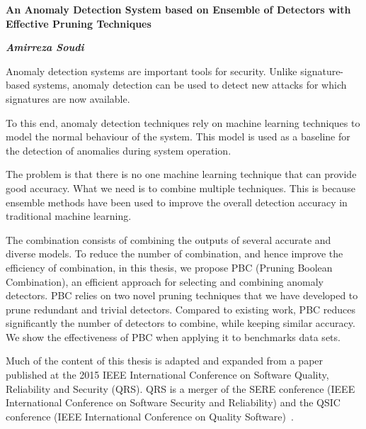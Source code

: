 \begin{center}
\textbf{An Anomaly Detection System based on Ensemble of Detectors with Effective Pruning Techniques}
\end{center}
\begin{center}
\textbf{\emph{Amirreza Soudi}}
\end{center}
Anomaly detection systems are important tools for security. Unlike signature-based systems, anomaly detection can be used to detect new attacks for which signatures are now available.

To this end, anomaly detection techniques rely on machine learning techniques to model the normal behaviour of the system. This model is used as a baseline for the detection of anomalies during system operation.

The problem is that there is no one machine learning technique that can provide good accuracy. What we need is to combine multiple techniques. This is because ensemble methods have been used to improve the overall detection accuracy in traditional machine learning. 

The combination consists of combining the outputs of several accurate and diverse models. To reduce the number of combination, and hence improve the efficiency of combination, in this thesis, we propose PBC (Pruning Boolean Combination), an efficient approach for selecting and combining anomaly detectors. PBC relies on two novel pruning techniques that we have developed to  prune redundant and trivial detectors. Compared to existing work, PBC reduces significantly the number of detectors to combine, while keeping similar accuracy. We show the effectiveness of PBC when applying it to benchmarks data sets.

Much of the content of this thesis is adapted and expanded from a paper published at the 2015 IEEE International Conference on Software Quality, Reliability and Security (QRS). QRS is a merger of the SERE conference (IEEE International Conference on Software Security and Reliability) and the QSIC conference (IEEE International Conference on Quality Software)~\cite{Soudi2015}. 
